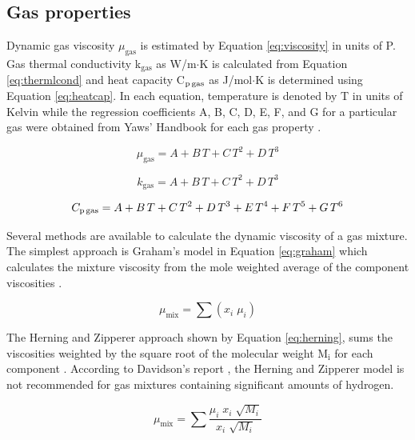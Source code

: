\documentclass{article}
\begin{document}
\subsection{Gas properties}

Dynamic gas viscosity $\mu_\text{gas}$ is estimated by Equation \ref{eq:viscosity} in units of \textmugreek P. Gas thermal conductivity k$_\text{gas}$ as W/m$\cdot$K is calculated from Equation \ref{eq:thermlcond} and heat capacity C$_\text{p\,gas}$ as J/mol$\cdot$K is determined using Equation \ref{eq:heatcap}. In each equation, temperature is denoted by T in units of Kelvin while the regression coefficients A, B, C, D, E, F, and G for a particular gas were obtained from Yaws' Handbook for each gas property \cite{Yaws2014}.

\begin{equation}\label{eq:viscosity}
    \mu_\text{gas} = A + B\,T + C\,T^2 + D\,T^3
\end{equation}

\begin{equation}\label{eq:thermlcond}
    k_\text{gas} = A + B\,T + C\,T^2 + D\,T^3
\end{equation}

\begin{equation}\label{eq:heatcap}
    C_\text{p\,gas} = A + B\,T + C\,T^2 + D\,T^3 + E\,T^4 + F\,T^5 + G\,T^6
\end{equation}

Several methods are available to calculate the dynamic viscosity of a gas mixture. The simplest approach is Graham's model in Equation \ref{eq:graham} which calculates the mixture viscosity from the mole weighted average of the component viscosities \cite{Graham-1846}.

\begin{equation}
    \mu_\text{mix} = \sum(x_i \; \mu_i)
    \label{eq:graham}
\end{equation}

\noindent The Herning and Zipperer approach shown by Equation \ref{eq:herning}, sums the viscosities weighted by the square root of the molecular weight M$_\text{i}$ for each component \cite{Herning-1936}. According to Davidson's report \cite{Davidson-1993}, the Herning and Zipperer model is not recommended for gas mixtures containing significant amounts of hydrogen.

\begin{equation}
    \mu_\text{mix} = \sum \frac{\mu_i \; x_i \; \sqrt{M_i}}{x_i \; \sqrt{M_i}}
    \label{eq:herning}
\end{equation}
\end{document}
